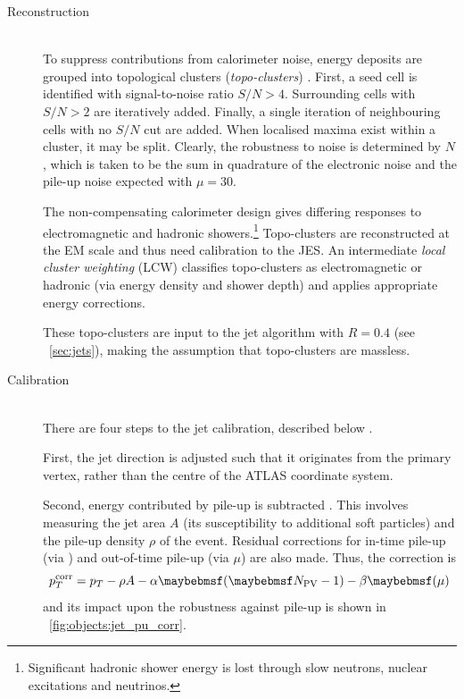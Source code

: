 \begin{description}
\item[Reconstruction] \hfill \\
	To suppress contributions from calorimeter noise, energy deposits are grouped into 
	topological clusters (\textit{topo-clusters}) \cite{Jets:Calib:2010,Jets:Calib:2011}. 
	First, a seed cell is identified with signal-to-noise ratio $S/N > 4$. Surrounding 
	cells with $S/N > 2$ are iteratively added. Finally, a single iteration of 
	neighbouring cells with no $S/N$ cut are added. When localised maxima exist within a 
	cluster, it may be split. Clearly, the robustness to noise is determined by $N$, 
	which is taken to be the sum in quadrature of the electronic noise and the pile-up 
	noise expected with $\mu = 30$.

	The non-compensating calorimeter design gives differing responses to electromagnetic 
	and hadronic showers.\footnote{
		Significant hadronic shower energy is lost through slow neutrons, nuclear 
		excitations and neutrinos.
	}
	Topo-clusters are reconstructed at the EM scale and thus need calibration to the 
	\ac{JES}. An intermediate \textit{local cluster weighting} (LCW) classifies 
	topo-clusters as electromagnetic or hadronic (via energy density and shower depth) 
	and applies appropriate energy corrections.
	
	These topo-clusters are input to the \antikt jet algorithm with $R = 0.4$ (see 
	\Section~\ref{sec:jets}), making the assumption that topo-clusters are massless.
\item[Calibration] \hfill \\
	There are four steps to the jet calibration, described below \cite{Jets:Calib:2011}.

	First, the jet direction is adjusted such that it originates from the primary vertex, 
	rather than the centre of the ATLAS coordinate system.

	Second, energy contributed by pile-up is subtracted \cite{Jets:PileupCorrection:2012}.
	This involves measuring the jet area $A$ (its susceptibility to additional soft 
	particles) and the pile-up density $\rho$ of the event. Residual corrections for 
	in-time pile-up (via \npv) and out-of-time pile-up (via $\mu$) are also made. Thus,
	the correction is
	\begin{equation}
		p_T^{\text{corr}} = p_T - \rho A - \alpha \parenths{\npv - 1} 
		- \beta \parenths{\mu}
	\end{equation}
	and its impact upon the robustness against pile-up is shown in 
	\Figure~\ref{fig:objects:jet_pu_corr}.


\end{description}
